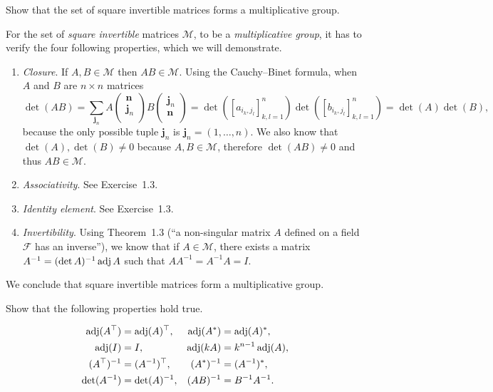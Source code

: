 Show that the set of square invertible matrices forms a multiplicative group.
\begin{solution}
  For the set of \emph{square invertible} matrices $\mathcal{M}$,
  to be a \emph{multiplicative group}, it has to verify the four following properties,
  which we will demonstrate.
  \begin{enumerate}
    \item \emph{Closure}. If $A,B \in \mathcal{M}$ then $AB \in \mathcal{M}$.
    Using the Cauchy--Binet formula, when $A$ and $B$ are $n \times n$ matrices
    \[
      \det(AB) = \sum_{\mathbf{j}_n}
      A
      \begin{pmatrix}
        \mathbf{n} \\
        \mathbf{j}_n \\
      \end{pmatrix}
      B
      \begin{pmatrix}
        \mathbf{j}_n \\
        \mathbf{n} \\
      \end{pmatrix}
      =\det\left([a_{i_k,j_l}]_{k,l=1}^{n}\right) \det\left([b_{i_k,j_l}]_{k,l=1}^{n}\right) 
      =\det(A) \det(B),
    \]
    because the only possible tuple $\mathbf{j}_n$ is $\mathbf{j}_n = (1,\dots,n)$.
    We also know that $\det(A), \det(B) \neq 0$ because $A, B \in \mathcal{M}$,
    therefore $\det(AB) \neq 0$ and thus $AB \in \mathcal{M}$.
    \item \emph{Associativity}. See Exercise~1.3.
    \item \emph{Identity element}. See Exercise~1.3.
    \item \emph{Invertibility}. Using Theorem~1.3 (``a non-singular matrix $A$ defined on a 
    field $\mathcal{F}$ has an inverse''),
    we know that if $A \in \mathcal{M}$,
    there exists a matrix $A^{-1} = (\det A)^{-1} \operatorname{adj} A$ 
    such that $A A^{-1} = A^{-1} A = I$.
  \end{enumerate}
  We conclude that square invertible matrices form a multiplicative group.
\end{solution}

Show that the following properties hold true.

\begin{align*}
\operatorname{adj}(A^\top) &= \operatorname{adj}(A)^\top, & \operatorname{adj}(A^*) &= \operatorname{adj}(A)^*,\\
\operatorname{adj}(I) &= I, & \operatorname{adj}(kA) &= k^{n-1} \operatorname{adj}(A),\\
(A^\top)^{-1} &= (A^{-1})^\top, & (A^*)^{-1} &= (A^{-1})^*,\\
\det(A^{-1}) &= \det(A)^{-1}, & (AB)^{-1} &= B^{-1}A^{-1}.
\end{align*}


